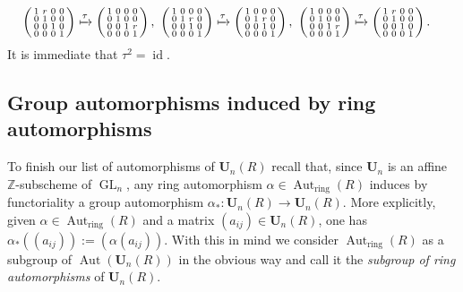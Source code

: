 \documentclass[a4paper,11pt]{amsart}
\numberwithin{equation}{section}
\theoremstyle{plain}
\theoremstyle{definition}
\newcommand{\Z}{\mathbb{Z}}
\newcommand{\anel}[1]{#1_{\text{ring}}} %
\DeclareMathOperator{\GL}{GL} %
\newcommand{\mbU}{\mathbf{U}} %
\DeclareMathOperator{\Aut}{Aut}
\DeclareMathOperator{\id}{id}
\begin{document}
\begin{align*}
\left(\begin{smallmatrix}
    1 & r & 0 & 0 \\ 0 & 1 & 0 & 0 \\ 0 & 0 & 1 & 0 \\0 & 0 & 0 & 1 
\end{smallmatrix}\right)&
\xmapsto{\tau}\left(\begin{smallmatrix}
    1 & 0 & 0 & 0 \\ 0 & 1 & 0 & 0 \\ 0 & 0 & 1 & r \\ 0 & 0 & 0 & 1
\end{smallmatrix}\right), \, \,
%
\left(\begin{smallmatrix}
    1 & 0 & 0 & 0 \\ 0 & 1 & r & 0 \\ 0 & 0 & 1 & 0 \\0 & 0 & 0 & 1 
\end{smallmatrix}\right)
\xmapsto{\tau}\left(\begin{smallmatrix}
    1 & 0 & 0 & 0 \\ 0 & 1 & r & 0 \\ 0 & 0 & 1 & 0 \\ 0 & 0 & 0 & 1
\end{smallmatrix}\right), \, \,
\left(\begin{smallmatrix}
    1 & 0 & 0 & 0 \\ 0 & 1 & 0 & 0 \\ 0 & 0 & 1 & r \\0 & 0 & 0 & 1 
\end{smallmatrix}\right)
\xmapsto{\tau}\left(\begin{smallmatrix}
    1 & r & 0 & 0 \\ 0 & 1 & 0 & 0 \\ 0 & 0 & 1 & 0 \\ 0 & 0 & 0 & 1
\end{smallmatrix}\right). 
\end{align*}
It is immediate that $\tau^2 = \id$.

\subsection{Group automorphisms induced by ring automorphisms}\label{Levchuk:ring}
To finish our list of automorphisms of $\mbU_n(R)$ recall that, since $\mbU_n$ is an affine $\Z$-subscheme of $\GL_n$, any ring automorphism $\alpha \in \anel{\Aut}(R)$ induces by functoriality a group automorphism $\alpha_\ast : \mbU_n(R) \to \mbU_n(R)$. More explicitly, given $\alpha \in \anel{\Aut}(R)$ and a matrix $(a_{ij}) \in \mbU_n(R)$, one has $\alpha_\ast((a_{ij})) := (\alpha(a_{ij}))$. With this in mind we consider $\anel{\Aut}(R)$ as a subgroup of $\Aut(\mbU_n(R))$ in the obvious way and call it the \emph{subgroup of ring automorphisms} of $\mbU_n(R)$.
\end{document}
